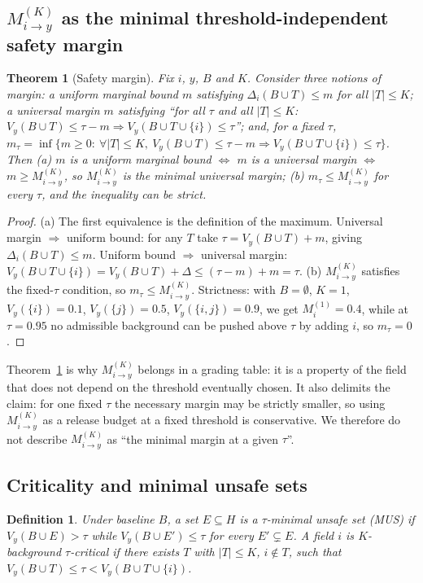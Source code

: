 \documentclass[preprint,12pt]{elsarticle}
\newtheorem{definition}{Definition}
\newtheorem{theorem}{Theorem}
\newcommand{\Vy}{V_{y}}
\newcommand{\Mik}{M^{(K)}_{i \to y}}
\begin{document}
\subsection{$\Mik$ as the minimal threshold-independent safety margin}
\begin{theorem}[Safety margin]\label{thm:margin}
Fix $i$, $y$, $B$ and $K$. Consider three notions of margin:
a \emph{uniform marginal bound} $m$ satisfying $\Delta_i(B\cup T)\le m$ for all $|T|\le K$;
a \emph{universal margin} $m$ satisfying
``for all $\tau$ and all $|T|\le K$: $\Vy(B\cup T)\le \tau-m \Rightarrow
\Vy(B\cup T\cup\{i\})\le\tau$'';
and, for a fixed $\tau$, $m_\tau=\inf\{m\ge 0:\ \forall |T|\le K,\
\Vy(B\cup T)\le\tau-m \Rightarrow \Vy(B\cup T\cup\{i\})\le\tau\}$. Then
\emph{(a)} $m$ is a uniform marginal bound $\iff$ $m$ is a universal margin $\iff$
$m \ge \Mik$, so $\Mik$ is the \emph{minimal universal margin};
\emph{(b)} $m_\tau \le \Mik$ for every $\tau$, and the inequality can be strict.
\end{theorem}
\begin{proof}
(a) The first equivalence is the definition of the maximum. Universal margin $\Rightarrow$
uniform bound: for any $T$ take $\tau=\Vy(B\cup T)+m$, giving $\Delta_i(B\cup T)\le m$.
Uniform bound $\Rightarrow$ universal margin: $\Vy(B\cup T\cup\{i\})=\Vy(B\cup T)+\Delta
\le (\tau-m)+m=\tau$. (b) $\Mik$ satisfies the fixed-$\tau$ condition, so
$m_\tau\le\Mik$. Strictness: with $B=\emptyset$, $K=1$, $\Vy(\{i\})=0.1$, $\Vy(\{j\})=0.5$,
$\Vy(\{i,j\})=0.9$, we get $M^{(1)}_{i}=0.4$, while at $\tau=0.95$ no admissible background
can be pushed above $\tau$ by adding $i$, so $m_\tau=0$.
\end{proof}

Theorem~\ref{thm:margin} is why $\Mik$ belongs in a grading table: it is a property of the
field that does not depend on the threshold eventually chosen. It also delimits the claim:
for one fixed $\tau$ the necessary margin may be strictly smaller, so using $\Mik$ as a
release budget at a fixed threshold is conservative. We therefore do not describe $\Mik$ as
``the minimal margin at a given $\tau$''.

\subsection{Criticality and minimal unsafe sets}
\begin{definition}
Under baseline $B$, a set $E\subseteq H$ is a \emph{$\tau$-minimal unsafe set} (MUS) if
$\Vy(B\cup E)>\tau$ while $\Vy(B\cup E')\le\tau$ for every $E'\subsetneq E$. A field $i$ is
\emph{$K$-background $\tau$-critical} if there exists $T$ with $|T|\le K$, $i\notin T$, such
that $\Vy(B\cup T)\le\tau<\Vy(B\cup T\cup\{i\})$.
\end{definition}
\end{document}
